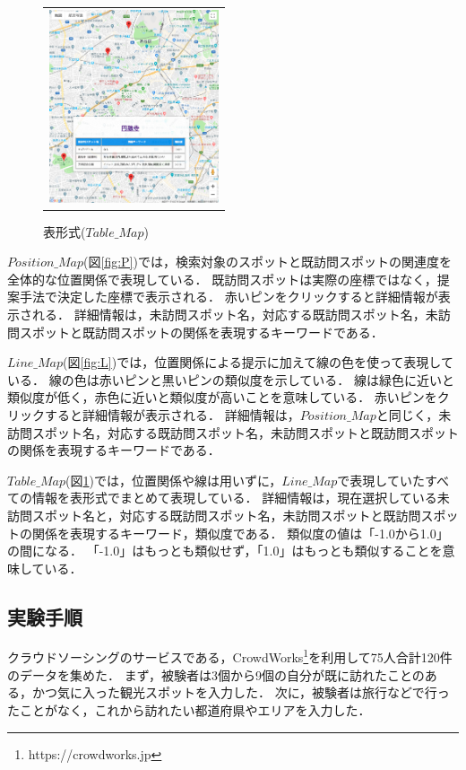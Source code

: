 \documentclass{deimj}
\begin{document}
\begin{figure}[t]
\begin{center}
\begin{tabular}{c}
      \begin{minipage}{0.33\hsize}
        \begin{center}
          \includegraphics[clip, width=5cm]{picture/table_map2.png}
          \hspace{0.1cm}
        \caption{表形式($Table\_Map$)}
        \label{fig:T}
        \end{center}
      \end{minipage}

    \end{tabular}
  \end{center}
\end{figure}

$Position\_Map$(図\ref{fig:P})では，検索対象のスポットと既訪問スポットの関連度を全体的な位置関係で表現している．
既訪問スポットは実際の座標ではなく，提案手法で決定した座標で表示される．
赤いピンをクリックすると詳細情報が表示される．
詳細情報は，未訪問スポット名，対応する既訪問スポット名，未訪問スポットと既訪問スポットの関係を表現するキーワードである．

$Line\_Map$(図\ref{fig:L})では，位置関係による提示に加えて線の色を使って表現している．
線の色は赤いピンと黒いピンの類似度を示している．
線は緑色に近いと類似度が低く，赤色に近いと類似度が高いことを意味している．
赤いピンをクリックすると詳細情報が表示される．
詳細情報は，$Position\_Map$と同じく，未訪問スポット名，対応する既訪問スポット名，未訪問スポットと既訪問スポットの関係を表現するキーワードである．

$Table\_Map$(図\ref{fig:T})では，位置関係や線は用いずに，$Line\_Map$で表現していたすべての情報を表形式でまとめて表現している．
詳細情報は，現在選択している未訪問スポット名と，対応する既訪問スポット名，未訪問スポットと既訪問スポットの関係を表現するキーワード，類似度である．
類似度の値は「-1.0から1.0」の間になる．
「-1.0」はもっとも類似せず，「1.0」はもっとも類似することを意味している．

\subsection{実験手順}
クラウドソーシングのサービスである，CrowdWorks\footnote{https://crowdworks.jp}を利用して75人合計120件のデータを集めた．
まず，被験者は3個から9個の自分が既に訪れたことのある，かつ気に入った観光スポットを入力した．
次に，被験者は旅行などで行ったことがなく，これから訪れたい都道府県やエリアを入力した．
\end{document}

